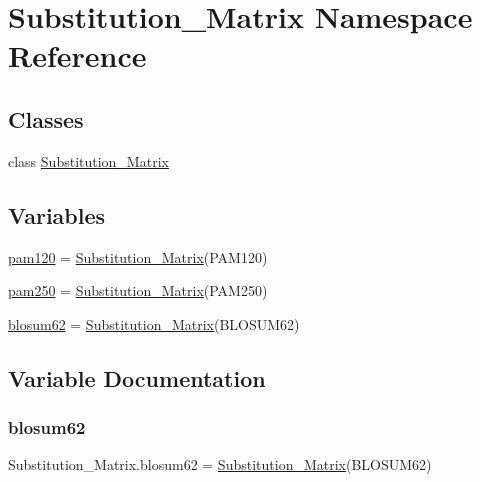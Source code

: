 \hypertarget{namespace_substitution___matrix}{}\section{Substitution\+\_\+\+Matrix Namespace Reference}
\label{namespace_substitution___matrix}
\subsection*{Classes}
\begin{DoxyCompactItemize}
\item 
class \hyperlink{class_substitution___matrix_1_1_substitution___matrix}{Substitution\+\_\+\+Matrix}
\end{DoxyCompactItemize}
\subsection*{Variables}
\begin{DoxyCompactItemize}
\item 
\hyperlink{namespace_substitution___matrix_a8495f9058eb7997200ab8a476c96c948}{pam120} = \hyperlink{class_substitution___matrix_1_1_substitution___matrix}{Substitution\+\_\+\+Matrix}(\textquotesingle{}P\+A\+M120\textquotesingle{})
\item 
\hyperlink{namespace_substitution___matrix_ad84746b6a1720d01b8648774f1020aa7}{pam250} = \hyperlink{class_substitution___matrix_1_1_substitution___matrix}{Substitution\+\_\+\+Matrix}(\textquotesingle{}P\+A\+M250\textquotesingle{})
\item 
\hyperlink{namespace_substitution___matrix_a9e4911111c065bc2e034165b9ddd1ca8}{blosum62} = \hyperlink{class_substitution___matrix_1_1_substitution___matrix}{Substitution\+\_\+\+Matrix}(\textquotesingle{}B\+L\+O\+S\+U\+M62\textquotesingle{})
\end{DoxyCompactItemize}


\subsection{Variable Documentation}
\mbox{\label{namespace_substitution___matrix_a9e4911111c065bc2e034165b9ddd1ca8}} 
\subsubsection{\texorpdfstring{blosum62}{blosum62}}
{\footnotesize\ttfamily Substitution\+\_\+\+Matrix.\+blosum62 = \hyperlink{class_substitution___matrix_1_1_substitution___matrix}{Substitution\+\_\+\+Matrix}(\textquotesingle{}B\+L\+O\+S\+U\+M62\textquotesingle{})}

